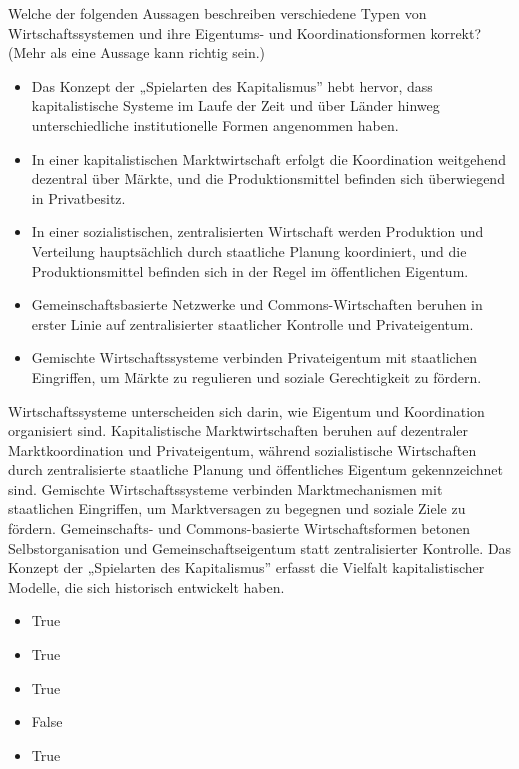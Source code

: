 \documentclass[
  nswissgerman,
  a4paper,
  DIV=11,
  numbers=noendperiod,
  oneside,
  openany]{scrreprt}
\providecommand{\tightlist}{%
  \setlength{\itemsep}{0pt}\setlength{\parskip}{0pt}}
\begin{document}
Welche der folgenden Aussagen beschreiben verschiedene Typen von
Wirtschaftssystemen und ihre Eigentums- und Koordinationsformen korrekt?
(Mehr als eine Aussage kann richtig sein.)

\begin{itemize}
\tightlist
\item[$\square$]
  Das Konzept der „Spielarten des Kapitalismus'' hebt hervor, dass
  kapitalistische Systeme im Laufe der Zeit und über Länder hinweg
  unterschiedliche institutionelle Formen angenommen haben.
\item[$\square$]
  In einer kapitalistischen Marktwirtschaft erfolgt die Koordination
  weitgehend dezentral über Märkte, und die Produktionsmittel befinden
  sich überwiegend in Privatbesitz.
\item[$\square$]
  In einer sozialistischen, zentralisierten Wirtschaft werden Produktion
  und Verteilung hauptsächlich durch staatliche Planung koordiniert, und
  die Produktionsmittel befinden sich in der Regel im öffentlichen
  Eigentum.
\item[$\square$]
  Gemeinschaftsbasierte Netzwerke und Commons-Wirtschaften beruhen in
  erster Linie auf zentralisierter staatlicher Kontrolle und
  Privateigentum.
\item[$\square$]
  Gemischte Wirtschaftssysteme verbinden Privateigentum mit staatlichen
  Eingriffen, um Märkte zu regulieren und soziale Gerechtigkeit zu
  fördern.
\end{itemize}

Wirtschaftssysteme unterscheiden sich darin, wie Eigentum und
Koordination organisiert sind. Kapitalistische Marktwirtschaften beruhen
auf dezentraler Marktkoordination und Privateigentum, während
sozialistische Wirtschaften durch zentralisierte staatliche Planung und
öffentliches Eigentum gekennzeichnet sind. Gemischte Wirtschaftssysteme
verbinden Marktmechanismen mit staatlichen Eingriffen, um Marktversagen
zu begegnen und soziale Ziele zu fördern. Gemeinschafts- und
Commons-basierte Wirtschaftsformen betonen Selbstorganisation und
Gemeinschaftseigentum statt zentralisierter Kontrolle. Das Konzept der
„Spielarten des Kapitalismus'' erfasst die Vielfalt kapitalistischer
Modelle, die sich historisch entwickelt haben.

\begin{itemize}
\tightlist
\item
  True
\item
  True
\item
  True
\item
  False
\item
  True
\end{itemize}
\end{document}
